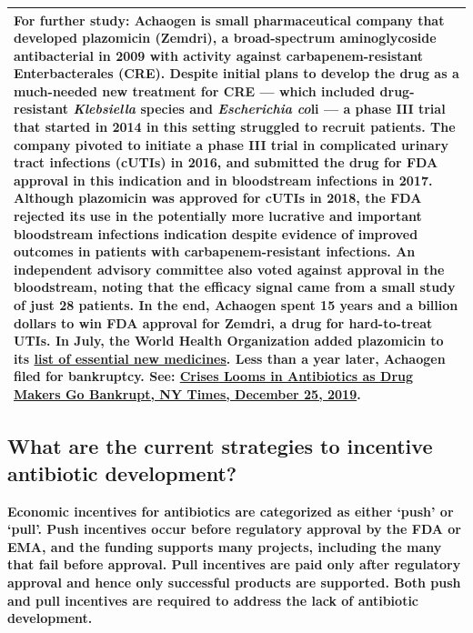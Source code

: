 \documentclass[
  11pt,
  paper=a4,
  ,captions=tableheading
]{scrartcl}
\begin{document}
\begin{longtable}[]{@{}
  >{\raggedright\arraybackslash}p{}@{}}
\toprule
\endhead
\textbf{For further study:} Achaogen is small pharmaceutical company
that developed plazomicin (Zemdri), a broad-spectrum aminoglycoside
antibacterial in 2009 with activity against carbapenem-resistant
Enterbacterales (CRE). Despite initial plans to develop the drug as a
much-needed new treatment for CRE --- which included drug-resistant
\emph{Klebsiella} species and \emph{Escherichia co}li --- a phase III
trial that started in 2014 in this setting struggled to recruit
patients. The company pivoted to initiate a phase III trial in
complicated urinary tract infections (cUTIs) in 2016, and submitted the
drug for FDA approval in this indication and in bloodstream infections
in 2017. Although plazomicin was approved for cUTIs in 2018, the FDA
rejected its use in the potentially more lucrative and important
bloodstream infections indication despite evidence of improved outcomes
in patients with carbapenem-resistant infections. An independent
advisory committee also voted against approval in the bloodstream,
noting that the efficacy signal came from a small study of just 28
patients. In the end, Achaogen spent 15 years and a billion dollars to
win FDA approval for Zemdri, a drug for hard-to-treat UTIs. In July, the
World Health Organization added plazomicin to its
\href{https://www.who.int/medicines/publications/essentialmedicines/en/}{list
of essential new medicines}. Less than a year later, Achaogen filed for
bankruptcy. See:
\href{https://www.nytimes.com/2019/12/25/health/antibiotics-new-resistance.html}{Crises
Looms in Antibiotics as Drug Makers Go Bankrupt, NY Times, December 25,
2019}. \\
\bottomrule
\end{longtable}

\hypertarget{what-are-the-current-strategies-to-incentive-antibiotic-development}{%
\subsection*{What are the current strategies to incentive antibiotic
development?}\label{what-are-the-current-strategies-to-incentive-antibiotic-development}}

\textbf{Economic incentives for antibiotics are categorized as either
`push' or `pull'. Push incentives occur before regulatory approval by
the FDA or EMA, and the funding supports many projects, including the
many that fail before approval. Pull incentives are paid only after
regulatory approval and hence only successful products are supported.
Both push and pull incentives are required to address the lack of
antibiotic development.}
\end{document}
